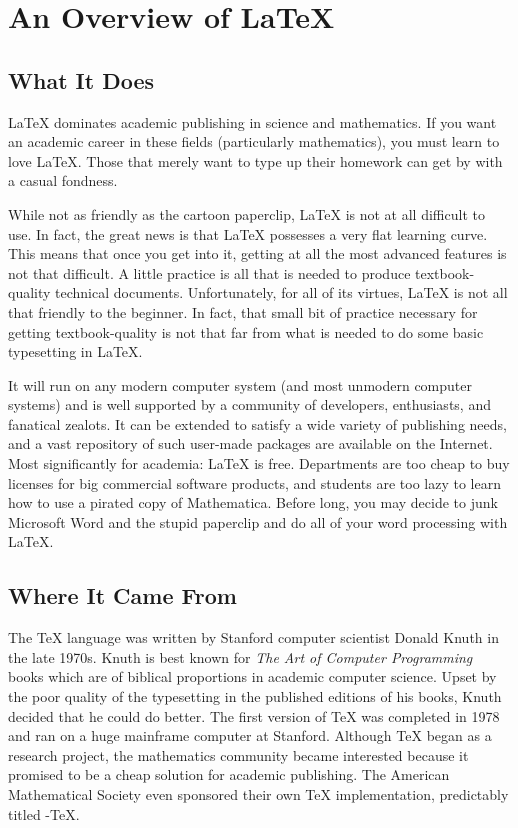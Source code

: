 \chapter{An Overview of \LaTeX{}}
\label{cha:an-overview-latex}

\section{What It Does}
\label{sec:what-it-does}

\LaTeX{} dominates academic publishing in science and mathematics.  If
you want an academic career in these fields (particularly
mathematics), you must learn to love \LaTeX{}.  Those that merely want
to type up their homework can get by with a casual fondness.

While not as friendly as the cartoon paperclip, \LaTeX{} is not at all
difficult to use.  In fact, the great news is that \LaTeX{} possesses
a very flat learning curve.  This means that once you get into it,
getting at all the most advanced features is not that difficult.  A
little practice is all that is needed to produce textbook-quality
technical documents.  Unfortunately, for all of its virtues, \LaTeX{}
is not all that friendly to the beginner.  In fact, that small bit of
practice necessary for getting textbook-quality is not that far from
what is needed to do some basic typesetting in \LaTeX{}.

It will run on any modern computer system (and most unmodern computer
systems) and is well supported by a community of developers,
enthusiasts, and fanatical zealots.  It can be extended to satisfy a
wide variety of publishing needs, and a vast repository of such
user-made packages are available on the Internet.  Most significantly
for academia: \LaTeX{} is free.  Departments are too cheap to buy
licenses for big commercial software products, and students are too
lazy to learn how to use a pirated copy of Mathematica.  Before long,
you may decide to junk Microsoft Word and the stupid paperclip and do
all of your word processing with \LaTeX{}.

\section{Where It Came From}
\label{sec:where-it-came}

The \TeX{} language was written by Stanford computer scientist Donald
Knuth in the late 1970s.  Knuth is best known for \emph{The Art of
  Computer Programming} books which are of biblical proportions in
academic computer science.  Upset by the poor quality of the
typesetting in the published editions of his books, Knuth decided that
he could do better.  The first version of \TeX{} was completed in 1978
and ran on a huge mainframe computer at Stanford.  Although \TeX{}
began as a research project, the mathematics community became
interested because it promised to be a cheap solution for academic
publishing.  The American Mathematical Society even sponsored their
own \TeX{} implementation, predictably titled \AmS-\TeX{}.

